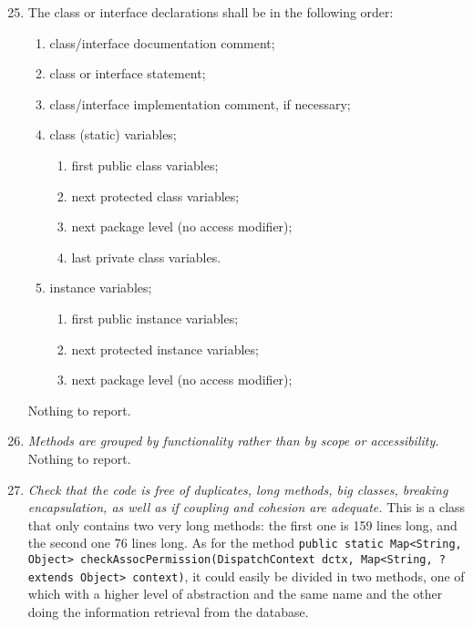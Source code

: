 		\begin{enumerate}
			\setcounter{enumi}{24}
			\item \begin{itshape}
				The class or interface declarations shall be in the following order:
				\begin{enumerate}[label={(\alph*)}]
					\item class/interface documentation comment;
					\item class or interface statement;
					\item class/interface implementation comment, if necessary;
					\item class (static) variables;
						\begin{enumerate}[label=\roman*]
							\item first public class variables;
							\item next protected class variables;
							\item next package level (no access modifier);
							\item last private class variables.
						\end{enumerate}
					\item instance variables;
						\begin{enumerate}[label=\roman*]
							\item first public instance variables;
							\item next protected instance variables;
							\item next package level (no access modifier);
						\end{enumerate}
				\end{enumerate}
			\end{itshape}
			Nothing to report. %

			\item \textit{Methods are grouped by functionality rather than by scope or accessibility.}\newline
			Nothing to report. %

			\item \textit{Check that the code is free of duplicates, long methods, big classes, breaking encapsulation, as well as if coupling and cohesion are adequate.}
			This is a class that only contains two very long methods: the first one is 159 lines long, and the second one 76 lines long. As for the method \texttt{public static Map<String, Object> checkAssocPermission(DispatchContext dctx, Map<String, ? extends Object> context)}, it could easily be divided in two methods, one of which with a higher level of abstraction and the same name and the other doing the information retrieval from the database. %
			
		\end{enumerate}

